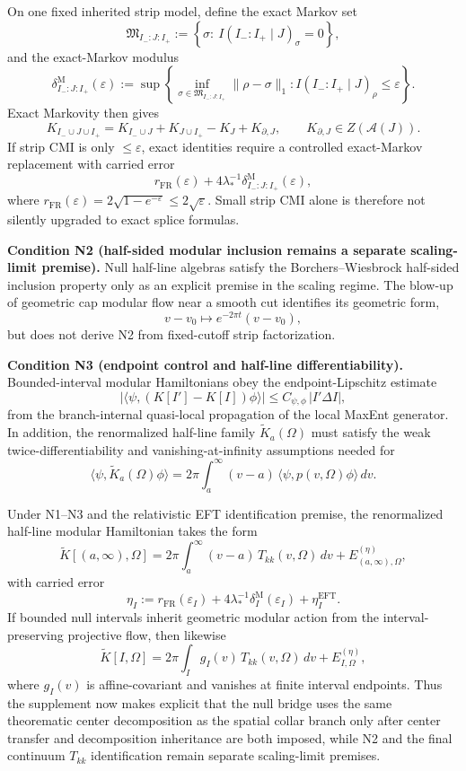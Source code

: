 On one fixed inherited strip model, define the exact Markov set
\[
\mathfrak M_{I_-:J:I_+}
:=
\left\{
\sigma:\ I(I_-:I_+\mid J)_\sigma=0
\right\},
\]
and the exact-Markov modulus
\[
\delta^{\mathrm M}_{I_-:J:I_+}(\varepsilon)
:=
\sup\left\{
\inf_{\sigma\in\mathfrak M_{I_-:J:I_+}}\|\rho-\sigma\|_1:
I(I_-:I_+\mid J)_\rho\le\varepsilon
\right\}.
\]
Exact Markovity then gives
\[
K_{I_-\cup J\cup I_+}
=
K_{I_-\cup J}+K_{J\cup I_+}-K_J+K_{\partial,J},
\qquad
K_{\partial,J}\in Z(\mathcal A(J)).
\]
If strip CMI is only \(\le \varepsilon\), exact identities require a controlled exact-Markov replacement with carried error
\[
r_{\mathrm{FR}}(\varepsilon)
+
4\lambda_\ast^{-1}\delta^{\mathrm M}_{I_-:J:I_+}(\varepsilon),
\]
where \(r_{\mathrm{FR}}(\varepsilon)=2\sqrt{1-e^{-\varepsilon}}\le 2\sqrt{\varepsilon}\). Small strip CMI alone is therefore not silently upgraded to exact splice formulas.

\textbf{Condition N2 (half-sided modular inclusion remains a separate scaling-limit premise).} Null half-line algebras satisfy the Borchers--Wiesbrock half-sided inclusion property only as an explicit premise in the scaling regime. The blow-up of geometric cap modular flow near a smooth cut identifies its geometric form,
\[
v-v_0 \mapsto e^{-2\pi t}(v-v_0),
\]
but does not derive N2 from fixed-cutoff strip factorization.

\textbf{Condition N3 (endpoint control and half-line differentiability).} Bounded-interval modular Hamiltonians obey the endpoint-Lipschitz estimate
\[
\bigl|\langle\psi,(K[I']-K[I])\phi\rangle\bigr|
\le
C_{\psi,\phi}\,|I'\Delta I|,
\]
from the branch-internal quasi-local propagation of the local MaxEnt generator. In addition, the renormalized half-line family \(\widetilde K_a(\Omega)\) must satisfy the weak twice-differentiability and vanishing-at-infinity assumptions needed for
\[
\langle\psi,\widetilde K_a(\Omega)\phi\rangle
=
2\pi\int_a^\infty (v-a)\,\langle\psi,p(v,\Omega)\phi\rangle\,dv.
\]

Under N1--N3 and the relativistic EFT identification premise, the renormalized half-line modular Hamiltonian takes the form
\[
\widetilde K[(a,\infty),\Omega]
=
2\pi\int_a^\infty (v-a)\,T_{kk}(v,\Omega)\,dv
+
E^{(\eta)}_{(a,\infty),\Omega},
\]
with carried error
\[
\eta_I
:=
r_{\mathrm{FR}}(\varepsilon_I)
+
4\lambda_\ast^{-1}\delta^{\mathrm M}_{I}(\varepsilon_I)
+
\eta_I^{\mathrm{EFT}}.
\]
If bounded null intervals inherit geometric modular action from the interval-preserving projective flow, then likewise
\[
\widetilde K[I,\Omega]
=
2\pi\int_I g_I(v)\,T_{kk}(v,\Omega)\,dv
+
E^{(\eta)}_{I,\Omega},
\]
where \(g_I(v)\) is affine-covariant and vanishes at finite interval endpoints. Thus the supplement now makes explicit that the null bridge uses the same theorematic center decomposition as the spatial collar branch only after center transfer and decomposition inheritance are both imposed, while N2 and the final continuum \(T_{kk}\) identification remain separate scaling-limit premises.
